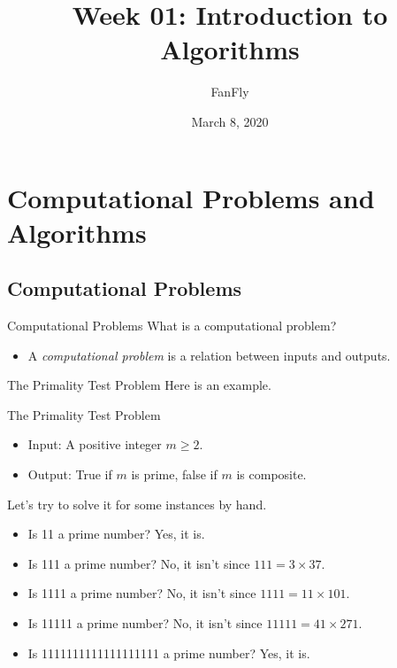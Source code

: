 \documentclass{beamer}
\title{Week 01: Introduction to Algorithms}
\author{FanFly}
\date{March 8, 2020}
\begin{document}
\begin{frame}
  \titlepage
\end{frame}

\section{Computational Problems and Algorithms}
\subsection{Computational Problems}
\begin{frame}{Computational Problems}
  What is a computational problem? \pause
  \begin{itemize}
    \item A \emph{computational problem} is a relation between inputs and
    outputs.
  \end{itemize}
\end{frame}

\begin{frame}{The Primality Test Problem}
  Here is an example. \pause
  \begin{block}{The Primality Test Problem}
    \pause
    \begin{itemize}
      \item Input: A positive integer $m \geq 2$. \pause
      \item Output: True if $m$ is prime, false if $m$ is composite. \pause
    \end{itemize}
  \end{block}
  Let's try to solve it for some instances by hand. \pause
  \begin{itemize}
    \item Is 11 a prime number? \pause
    Yes, it is. \pause
    \item Is 111 a prime number? \pause
    No, it isn't since $111 = 3 \times 37$. \pause
    \item Is 1111 a prime number? \pause
    No, it isn't since $1111 = 11 \times 101$. \pause
    \item Is 11111 a prime number? \pause
    No, it isn't since $11111 = 41 \times 271$. \pause
    \item Is 1111111111111111111 a prime number? \pause
    Yes, it is.
  \end{itemize}
\end{frame}
\end{document}
